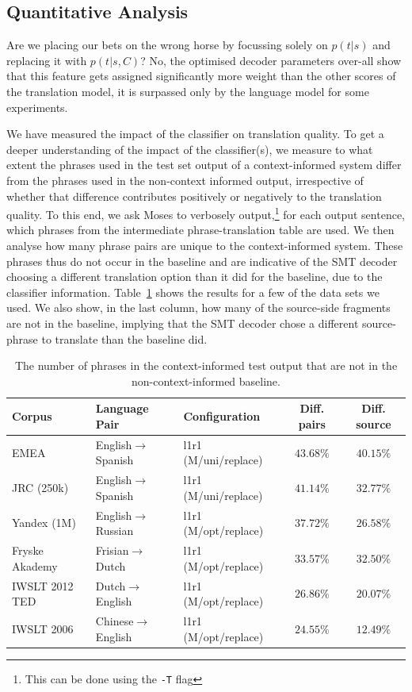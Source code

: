 \documentclass[smallextended]{svjour3}       %
\theoremstyle{break}
\begin{document}
\subsection{Quantitative Analysis}

Are we placing our bets on the wrong horse by focussing solely on $p(t|s)$ and
replacing it with $p(t|s,C)$? No, the optimised decoder parameters over-all
show that this feature gets assigned significantly more weight than the other
scores of the translation model, it is surpassed only by the language model for
some experiments.

We have measured the impact of the classifier on translation quality. To get a
deeper understanding of the impact of the classifier(s), we measure to what
extent the phrases used in the test set output of a context-informed system
differ from the phrases used in the non-context informed output, irrespective
of whether that difference contributes positively or negatively to the
translation quality. To this end, we ask Moses to verbosely
output,\footnote{This can be done using the \texttt{-T} flag} for each output
sentence, which phrases from the intermediate phrase-translation table are
used. We then analyse how many phrase pairs are unique to the context-informed
system. These phrases thus do not occur in the baseline and are indicative of
the SMT decoder choosing a different translation option than it did for the
baseline, due to the classifier information. Table~\ref{tab:decodediff} shows
the results for a few of the data sets we used. We also show, in the last
column, how many of the source-side fragments are not in the baseline, implying
that the SMT decoder chose a different source-phrase to translate than the
baseline did.

\begin{table}
\begin{center}
\begin{tabular}{|lll|cc|}
\hline
\textbf{Corpus} & \textbf{Language Pair} & \textbf{Configuration} &
\textbf{Diff. pairs} & \textbf{Diff. source} \\
\hline
EMEA & English$\rightarrow$Spanish & l1r1 (M/uni/replace) & $43.68\%$ & $40.15\%$ \\
JRC (250k) & English$\rightarrow$Spanish & l1r1 (M/uni/replace) & $41.14\%$ & $32.77\%$ \\
Yandex (1M) & English$\rightarrow$Russian & l1r1 (M/opt/replace) & $37.72\%$ & $26.58\%$ \\
Fryske Akademy & Frisian$\rightarrow$Dutch & l1r1 (M/opt/replace) & $33.57\%$ & $32.50\%$ \\
IWSLT 2012 TED & Dutch$\rightarrow$English & l1r1 (M/opt/replace) & $26.86\%$ & $20.07\%$ \\
IWSLT 2006 & Chinese$\rightarrow$English & l1r1 (M/opt/replace) & $24.55\%$ & $12.49\%$ \\
\hline
\end{tabular}
\caption{The number of phrases in the context-informed test output that are not
in the non-context-informed baseline.}
\label{tab:decodediff}
\end{center}
\end{table}
\end{document}

